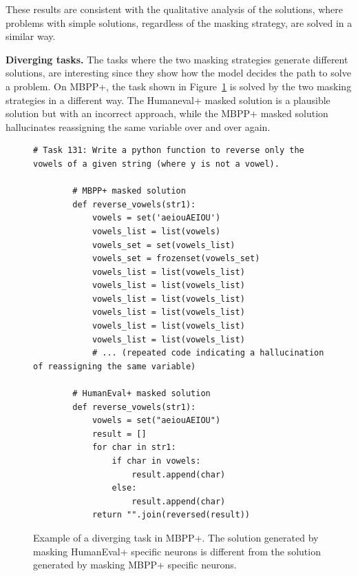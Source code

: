\documentclass[mscthesis]{usiinfthesis}
\begin{document}
These results are consistent with the qualitative analysis of the solutions,
where problems with simple solutions, regardless of the masking strategy, are solved in a similar way.
\par\vspace{1em}
\textbf{Diverging tasks. }
 The tasks where the two masking strategies generate different solutions, are interesting
since they show how the model decides the path to solve a problem.
On MBPP+, the task shown in Figure~\ref{fig:diverging_task} is solved by the two masking
strategies in a different way.
The Humaneval+ masked solution is a plausible solution but with an incorrect approach, while 
the MBPP+ masked solution hallucinates reassigning the same variable over and over again.
\begin{figure}[h]
\begin{lstlisting}[style=pythonstyle2]
    # Task 131: Write a python function to reverse only the vowels of a given string (where y is not a vowel).

        # MBPP+ masked solution
        def reverse_vowels(str1):
            vowels = set('aeiouAEIOU')
            vowels_list = list(vowels)
            vowels_set = set(vowels_list)
            vowels_set = frozenset(vowels_set)
            vowels_list = list(vowels_list)
            vowels_list = list(vowels_list)
            vowels_list = list(vowels_list)
            vowels_list = list(vowels_list)
            vowels_list = list(vowels_list)
            vowels_list = list(vowels_list)
            # ... (repeated code indicating a hallucination of reassigning the same variable)
        
        # HumanEval+ masked solution
        def reverse_vowels(str1):
            vowels = set("aeiouAEIOU")
            result = []
            for char in str1:
                if char in vowels:
                    result.append(char)
                else:
                    result.append(char)
            return "".join(reversed(result))
\end{lstlisting}
\caption{Example of a diverging task in MBPP+. The solution generated by masking HumanEval+ specific neurons is different from the solution generated by masking MBPP+ specific neurons.}
\label{fig:diverging_task}
\end{figure}
\end{document}

